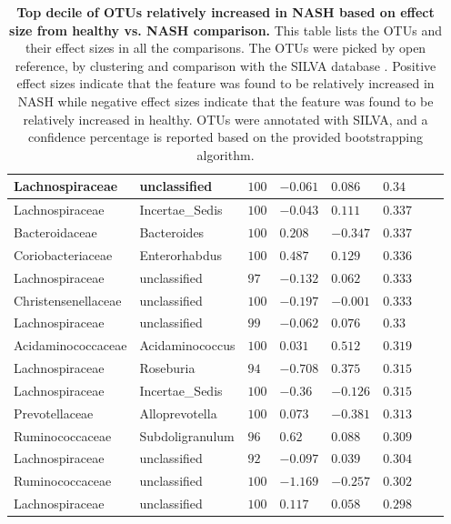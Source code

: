 \begin{table}[!ht]
\begin{tiny}
\begin{tabular}{|l|l|l|l|l|l|l|l|}
Lachnospiraceae & unclassified & $100$ & $-0.061$ & $0.086$ & $0.34$ \\ \hline
Lachnospiraceae & Incertae_Sedis & $100$ & $-0.043$ & $0.111$ & $0.337$ \\ \hline
Bacteroidaceae & Bacteroides & $100$ & $0.208$ & $-0.347$ & $0.337$ \\ \hline
Coriobacteriaceae & Enterorhabdus & $100$ & $0.487$ & $0.129$ & $0.336$ \\ \hline
Lachnospiraceae & unclassified & $97$ & $-0.132$ & $0.062$ & $0.333$ \\ \hline
Christensenellaceae & unclassified & $100$ & $-0.197$ & $-0.001$ & $0.333$ \\ \hline
Lachnospiraceae & unclassified & $99$ & $-0.062$ & $0.076$ & $0.33$ \\ \hline
Acidaminococcaceae & Acidaminococcus & $100$ & $0.031$ & $0.512$ & $0.319$ \\ \hline
Lachnospiraceae & Roseburia & $94$ & $-0.708$ & $0.375$ & $0.315$ \\ \hline
Lachnospiraceae & Incertae_Sedis & $100$ & $-0.36$ & $-0.126$ & $0.315$ \\ \hline
Prevotellaceae & Alloprevotella & $100$ & $0.073$ & $-0.381$ & $0.313$ \\ \hline
Ruminococcaceae & Subdoligranulum & $96$ & $0.62$ & $0.088$ & $0.309$ \\ \hline
Lachnospiraceae & unclassified & $92$ & $-0.097$ & $0.039$ & $0.304$ \\ \hline
Ruminococcaceae & unclassified & $100$ & $-1.169$ & $-0.257$ & $0.302$ \\ \hline
Lachnospiraceae & unclassified & $100$ & $0.117$ & $0.058$ & $0.298$ \\ \hline
\end{tabular}
\end{tiny}
\caption[Top decile of OTUs relatively increased in NASH based on effect size from healthy vs. NASH comparison.]{ \textbf{Top decile of OTUs relatively increased in NASH based on effect size from healthy vs. NASH comparison.} This table lists the OTUs and their effect sizes in all the comparisons. The OTUs were picked by open reference, by clustering and comparison with the SILVA database \cite{quast2013silva}. Positive effect sizes indicate that the feature was found to be relatively increased in NASH while negative effect sizes indicate that the feature was found to be relatively increased in healthy. OTUs were annotated with SILVA, and a confidence percentage is reported based on the provided bootstrapping algorithm.}
\label{nafld_top_otu_table}
\end{table}

